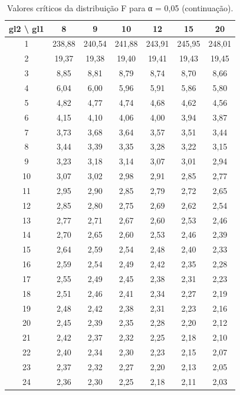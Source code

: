 \documentclass[
]{book}
\begin{document}
\begin{table}

\caption{Valores críticos da distribuição F para α = 0,05 (continuação).}
\centering
\begin{tabular}[t]{c|c|c|c|c|c|c}
\hline
gl2 \textbackslash{} gl1 & 8 & 9 & 10 & 12 & 15 & 20\\
\hline
1 & 238,88 & 240,54 & 241,88 & 243,91 & 245,95 & 248,01\\
\hline
2 & 19,37 & 19,38 & 19,40 & 19,41 & 19,43 & 19,45\\
\hline
3 & 8,85 & 8,81 & 8,79 & 8,74 & 8,70 & 8,66\\
\hline
4 & 6,04 & 6,00 & 5,96 & 5,91 & 5,86 & 5,80\\
\hline
5 & 4,82 & 4,77 & 4,74 & 4,68 & 4,62 & 4,56\\
\hline
6 & 4,15 & 4,10 & 4,06 & 4,00 & 3,94 & 3,87\\
\hline
7 & 3,73 & 3,68 & 3,64 & 3,57 & 3,51 & 3,44\\
\hline
8 & 3,44 & 3,39 & 3,35 & 3,28 & 3,22 & 3,15\\
\hline
9 & 3,23 & 3,18 & 3,14 & 3,07 & 3,01 & 2,94\\
\hline
10 & 3,07 & 3,02 & 2,98 & 2,91 & 2,85 & 2,77\\
\hline
11 & 2,95 & 2,90 & 2,85 & 2,79 & 2,72 & 2,65\\
\hline
12 & 2,85 & 2,80 & 2,75 & 2,69 & 2,62 & 2,54\\
\hline
13 & 2,77 & 2,71 & 2,67 & 2,60 & 2,53 & 2,46\\
\hline
14 & 2,70 & 2,65 & 2,60 & 2,53 & 2,46 & 2,39\\
\hline
15 & 2,64 & 2,59 & 2,54 & 2,48 & 2,40 & 2,33\\
\hline
16 & 2,59 & 2,54 & 2,49 & 2,42 & 2,35 & 2,28\\
\hline
17 & 2,55 & 2,49 & 2,45 & 2,38 & 2,31 & 2,23\\
\hline
18 & 2,51 & 2,46 & 2,41 & 2,34 & 2,27 & 2,19\\
\hline
19 & 2,48 & 2,42 & 2,38 & 2,31 & 2,23 & 2,16\\
\hline
20 & 2,45 & 2,39 & 2,35 & 2,28 & 2,20 & 2,12\\
\hline
21 & 2,42 & 2,37 & 2,32 & 2,25 & 2,18 & 2,10\\
\hline
22 & 2,40 & 2,34 & 2,30 & 2,23 & 2,15 & 2,07\\
\hline
23 & 2,37 & 2,32 & 2,27 & 2,20 & 2,13 & 2,05\\
\hline
24 & 2,36 & 2,30 & 2,25 & 2,18 & 2,11 & 2,03\\

\end{tabular}
\end{table}
\end{document}

